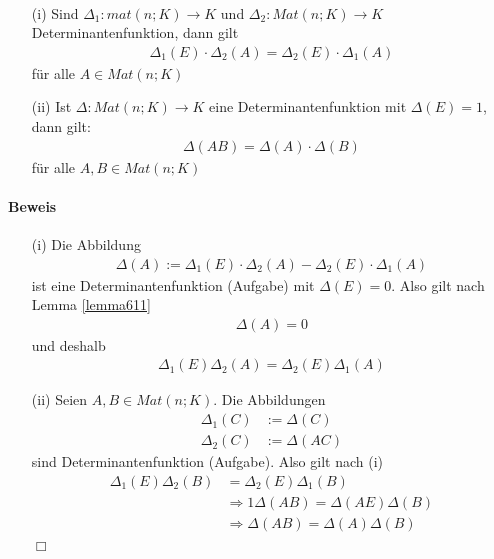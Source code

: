 \documentclass[11pt]{report}
\begin{document}
\begin{korollar} {\ \\}
\label{korollar612}
\begin{itemize}
 \item[(i)] Sind $\Delta_1: mat(n;K) \rightarrow K$ und $\Delta_2: Mat(n;K) \rightarrow K$ Determinantenfunktion, dann gilt
\begin{align}
\Delta_1 (E) \cdot \Delta_2(A) = \Delta_2(E) \cdot \Delta_1(A)
\end{align}
für alle $A \in Mat(n;K)$
 \item[(ii)] Ist $\Delta : Mat(n;K) \rightarrow K$ eine Determinantenfunktion mit $\Delta(E) = 1$, dann gilt:
\begin{align}
 \Delta(AB) = \Delta(A) \cdot \Delta(B)
\end{align}
für alle $A, B \in Mat(n;K)$
\end{itemize}
\end{korollar}

\paragraph{Beweis}
\begin{itemize}
 \item[(i)] Die Abbildung
\begin{align}
\Delta(A) := \Delta_1(E) \cdot \Delta_2(A) - \Delta_2(E) \cdot \Delta_1(A)
\end{align}
ist eine Determinantenfunktion (Aufgabe) mit $\Delta(E) = 0$. Also gilt nach Lemma \ref{lemma611}
\begin{align}
\Delta(A) = 0
\end{align}
und deshalb
\begin{align}
\Delta_1(E)\Delta_2(A) = \Delta_2(E) \Delta_1(A)
\end{align}

 \item[(ii)] Seien $A,B \in Mat(n;K)$. Die Abbildungen
\begin{align}
\Delta_1(C) &:= \Delta(C) \\
\Delta_2(C) &:= \Delta(AC)
\end{align}
sind Determinantenfunktion (Aufgabe). Also gilt nach (i)
\begin{align}
 \Delta_1(E) \Delta_2(B) &= \Delta_2(E) \Delta_1(B) \\
&\Rightarrow 1 \Delta(AB) = \Delta(AE) \Delta(B) \\
&\Rightarrow \Delta(AB) = \Delta(A) \Delta(B)
\end{align}
\hspace*{1cm} \hfill $\Box$
\end{itemize}
\end{document}
